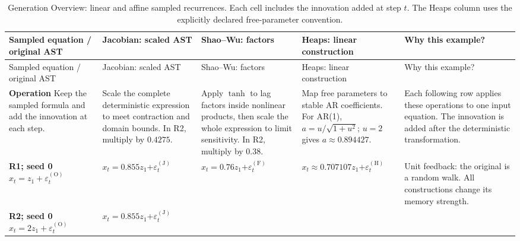 \begin{landscape}
\begingroup
\renewcommand{\baselinestretch}{1}
\footnotesize
\setlength{\tabcolsep}{3pt}
\setlength{\LTcapwidth}{.97\linewidth}
\renewcommand{\arraystretch}{1.2}
\begin{longtable}{@{}
>{\raggedright\arraybackslash}p{.15\linewidth}
>{\raggedright\arraybackslash}p{.17\linewidth}
>{\raggedright\arraybackslash}p{.20\linewidth}
>{\raggedright\arraybackslash}p{.20\linewidth}
>{\raggedright\arraybackslash}p{.23\linewidth}@{}}
\caption{Generation Overview: linear and affine sampled recurrences. Each cell
includes the innovation added at step $t$. The Heaps column uses the explicitly
declared free-parameter convention.}\label{tab:generation-overview-linear}\\
\toprule
Sampled equation / original AST & Jacobian: scaled AST & Shao--Wu: factors & Heaps: linear construction & Why this example?\\
\midrule
\endfirsthead
\toprule
Sampled equation / original AST & Jacobian: scaled AST & Shao--Wu: factors & Heaps: linear construction & Why this example?\\
\midrule
\endhead
\textbf{Operation}\newline
Keep the sampled formula and add the innovation at each step. &
Scale the complete deterministic expression to meet contraction and domain
bounds. In R2, multiply by $0.4275$. &
Apply $\tanh$ to lag factors inside nonlinear products, then scale the whole
expression to limit sensitivity. In R2, multiply by $0.38$. &
Map free parameters to stable AR coefficients. For AR(1),
$a=u/\sqrt{1+u^2}$; $u=2$ gives $a\approx0.894427$. &
Each following row applies these operations to one input equation.
The innovation is added after the deterministic transformation.\\
\midrule
\textbf{R1; seed 0}\newline
$x_t=z_1+\varepsilon_t^{(\mathrm O)}$ &
$x_t=0.855z_1$\newline $+\varepsilon_t^{(\mathrm J)}$ &
$x_t=0.76z_1$\newline $+\varepsilon_t^{(\mathrm F)}$ &
$x_t\approx0.707107z_1$\newline $+\varepsilon_t^{(\mathrm H)}$ &
Unit feedback: the original is a random walk. All constructions change
its memory strength.\\
\addlinespace
\textbf{R2; seed 0}\newline
$x_t=2z_1+\varepsilon_t^{(\mathrm O)}$ &
$x_t=0.855z_1$\newline $+\varepsilon_t^{(\mathrm J)}$ &

\end{longtable}
\end{landscape}
